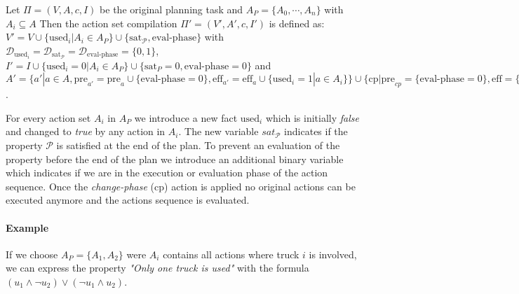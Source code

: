 \begin{definition}
	Let $\Pi = (V, A, c, I)$ be the original planning task and $A_P=\{A_0, \cdots, A_n\}$ 
	with $A_i \subseteq A$ 
	Then the action set compilation $\Pi' = (V', A', c, I')$ is defined as: 
	$V' = V \cup \{\text{used}_i | A_i \in A_P\} \cup \{\text{sat}_{\mathcal{P}}, \text{eval-phase}\}$ 
	with $\mathcal{D}_{\text{used}_i} = \mathcal{D}_{\text{sat}_{\mathcal{P}}} = \mathcal{D}_{\text{eval-phase}} = \{0,1\}$, 
	$I' = I \cup \{\text{used}_i = 0 | A_i \in A_P\} \cup \{\text{sat}_{P} = 0, \text{eval-phase} = 0\}$ 
	and $A' = \{ a' | a \in A, 
	\text{pre}_{a'} = \text{pre}_{a} \cup \{\text{eval-phase} = 0\} , \text{eff}_{a'} = \text{eff}_a \cup \{\text{used}_i = 1 | a \in A_i\}\} \cup 
	\{\text{cp} | \text{pre}_{cp} = \{\text{eval-phase} = 0\}, \text{eff} = \{\text{eval-phase} = 1 \}\} \cup 
	\{\text{actions to eval } \mathcal{P}\}$. 
\end{definition}


For every action set $A_i$ in $A_P$ we introduce a new fact $\text{used}_i$ which is initially 
\emph{false} and changed to \emph{true} by any action in $A_i$. The new variable $sat_{\mathcal{P}}$ indicates 
if the property $\mathcal{P}$ is satisfied at the end of the plan. To prevent an 
evaluation of the property before the end of the plan we introduce an additional binary variable
which indicates if we are in the execution or evaluation phase of the action sequence. Once the \textit{change-phase} (cp) action
is applied no original actions can be executed anymore and the actions sequence is evaluated.



\paragraph{Example} If we choose $A_P = \{A_1, A_2\}$ were $A_i$ contains all actions where truck $i$ 
is involved, we can express the property \emph{"Only one truck is used"} with the 
formula $(u_1 \wedge \neg u_2) \vee (\neg u_1 \wedge u_2)$.

